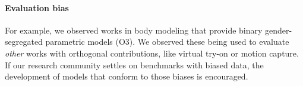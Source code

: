 \documentclass[nonacm,sigconf,review,balance=false]{acmart}
\begin{document}


\paragraph*{Evaluation bias} For example, we observed works in body modeling that provide binary gender-segregated parametric models (O3). We observed these being used to evaluate \emph{other} works with orthogonal contributions, like virtual try-on or motion capture. If our research community settles on benchmarks with biased data, the development of models that conform to those biases is encouraged.

\end{document}
